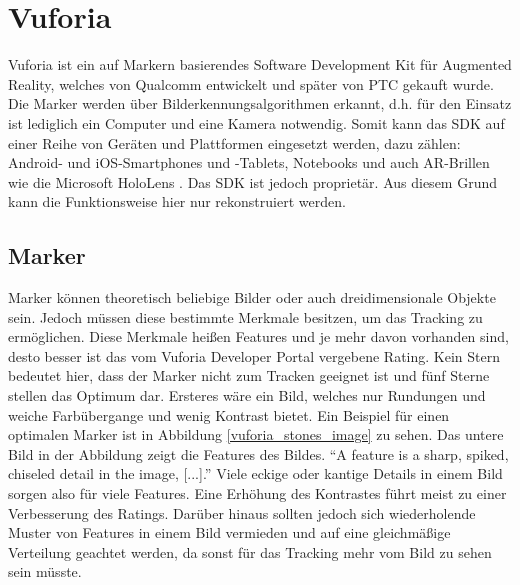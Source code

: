 
\section{Vuforia}

Vuforia ist ein auf Markern basierendes Software Development Kit für Augmented Reality, welches von Qualcomm entwickelt und später von PTC gekauft wurde. Die Marker werden über Bilderkennungsalgorithmen erkannt, d.h. für den Einsatz ist lediglich ein Computer und eine Kamera notwendig. Somit kann das SDK auf einer Reihe von Geräten und Plattformen eingesetzt werden, dazu zählen: Android- und iOS-Smartphones und -Tablets, Notebooks und auch AR-Brillen wie die Microsoft HoloLens \cite{vuforia_devices}. Das SDK ist jedoch proprietär. Aus diesem Grund kann die Funktionsweise hier nur rekonstruiert werden.

\subsection{Marker}
Marker können theoretisch beliebige Bilder oder auch dreidimensionale Objekte sein. Jedoch müssen diese bestimmte Merkmale besitzen, um das Tracking zu ermöglichen. Diese Merkmale heißen Features und je mehr davon vorhanden sind, desto besser ist das vom Vuforia Developer Portal vergebene Rating. Kein Stern bedeutet hier, dass der Marker nicht zum Tracken geeignet ist und fünf Sterne stellen das Optimum dar. Ersteres wäre ein Bild, welches nur Rundungen und weiche Farbübergange und wenig Kontrast bietet. Ein Beispiel für einen optimalen Marker ist in Abbildung \ref{vuforia_stones_image} zu sehen. Das untere Bild in der Abbildung zeigt die Features des Bildes. "`A feature is a sharp, spiked, chiseled detail in the image, [...]."'\cite{features} Viele eckige oder kantige Details in einem Bild sorgen also für viele Features. Eine Erhöhung des Kontrastes führt meist zu einer Verbesserung des Ratings. Darüber hinaus sollten jedoch sich wiederholende Muster von Features in einem Bild vermieden und auf eine gleichmäßige Verteilung geachtet werden, da sonst für das Tracking mehr vom Bild zu sehen sein müsste.

